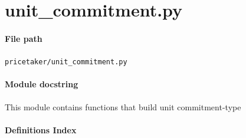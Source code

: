 \documentclass[11pt]{report}
\begin{document}
\section{unit\_commitment.py}
\label{file:pricetaker-unit_commitment.py}
\paragraph{File path} \texttt{pricetaker/unit\_commitment.py}
\paragraph{Module docstring} This module contains functions that build unit commitment-type
\paragraph{Definitions Index}
\end{document}
